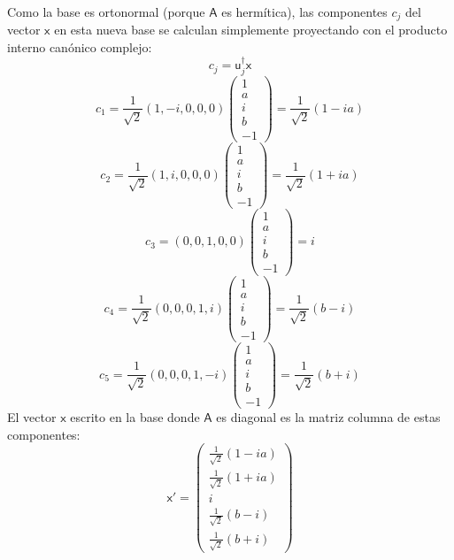 \documentclass[11pt,spanish]{article}
\newcommand{\mat}[1]{\mathsf{#1}}
\begin{document}
\begin{itemize}
Como la base es ortonormal (porque $\mat{A}$ es hermítica), las componentes $c_j$ del vector $\mat{x}$ en esta nueva base se calculan simplemente proyectando con el producto interno canónico complejo: 
$$c_j = \mat{u}_j^\dagger \mat{x}$$
$$c_1 = \frac{1}{\sqrt{2}} (1, -i, 0, 0, 0) \begin{pmatrix} 1 \\ a \\ i \\ b \\ -1 \end{pmatrix} = \frac{1}{\sqrt{2}} (1 - ia)$$
$$c_2 = \frac{1}{\sqrt{2}} (1, i, 0, 0, 0) \begin{pmatrix} 1 \\ a \\ i \\ b \\ -1 \end{pmatrix} = \frac{1}{\sqrt{2}} (1 + ia)$$
$$c_3 = (0, 0, 1, 0, 0) \begin{pmatrix} 1 \\ a \\ i \\ b \\ -1 \end{pmatrix} = i$$
$$c_4 = \frac{1}{\sqrt{2}} (0, 0, 0, 1, i) \begin{pmatrix} 1 \\ a \\ i \\ b \\ -1 \end{pmatrix} = \frac{1}{\sqrt{2}} (b - i)$$
$$c_5 = \frac{1}{\sqrt{2}} (0, 0, 0, 1, -i) \begin{pmatrix} 1 \\ a \\ i \\ b \\ -1 \end{pmatrix} = \frac{1}{\sqrt{2}} (b + i)$$
El vector $\mat{x}$ escrito en la base donde $\mat{A}$ es diagonal es la matriz columna de estas componentes:
$$
\mat{x}' = \begin{pmatrix} \frac{1}{\sqrt{2}}(1 - ia) \\ \frac{1}{\sqrt{2}}(1 + ia) \\ i \\ \frac{1}{\sqrt{2}}(b - i) \\ \frac{1}{\sqrt{2}}(b + i) \end{pmatrix}
$$
\end{itemize}
\end{document}
